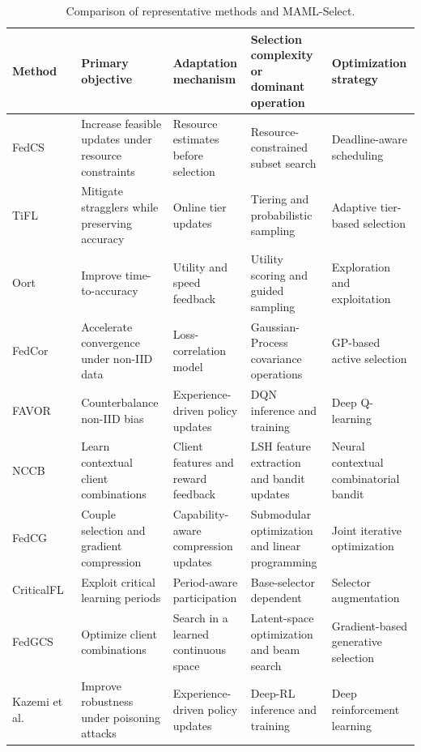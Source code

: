 \documentclass[journal]{IEEEtran}
\begin{document}
\begin{table}[!t]
    \caption{Comparison of representative methods and MAML-Select.}
    \label{tab:related_work_comparison}
    \centering
    \scriptsize
    \setlength{\tabcolsep}{3pt}
    \renewcommand{\arraystretch}{0.98}
    \begin{tabularx}{\textwidth}{lXXXX}
        \toprule
        \textbf{Method} & \textbf{Primary objective} & \textbf{Adaptation mechanism} & \textbf{Selection complexity or dominant operation} & \textbf{Optimization strategy} \\
        \midrule
        FedCS~\cite{nishio2019client} & Increase feasible updates under resource constraints & Resource estimates before selection & Resource-constrained subset search & Deadline-aware scheduling \\
        TiFL~\cite{chai2020tifl} & Mitigate stragglers while preserving accuracy & Online tier updates & Tiering and probabilistic sampling & Adaptive tier-based selection \\
        Oort~\cite{lai2021oort} & Improve time-to-accuracy & Utility and speed feedback & Utility scoring and guided sampling & Exploration and exploitation \\
        FedCor~\cite{tang2022fedcor} & Accelerate convergence under non-IID data & Loss-correlation model & Gaussian-Process covariance operations & GP-based active selection \\
        FAVOR~\cite{wang2020optimizing} & Counterbalance non-IID bias & Experience-driven policy updates & DQN inference and training & Deep Q-learning \\
        NCCB~\cite{pan2024contextual} & Learn contextual client combinations & Client features and reward feedback & LSH feature extraction and bandit updates & Neural contextual combinatorial bandit \\
        FedCG~\cite{xu2024federated} & Couple selection and gradient compression & Capability-aware compression updates & Submodular optimization and linear programming & Joint iterative optimization \\
        CriticalFL~\cite{yan2023criticalfl} & Exploit critical learning periods & Period-aware participation & Base-selector dependent & Selector augmentation \\
        FedGCS~\cite{ning2024fedgcs} & Optimize client combinations & Search in a learned continuous space & Latent-space optimization and beam search & Gradient-based generative selection \\
        Kazemi et al.~\cite{kazemi2026robust} & Improve robustness under poisoning attacks & Experience-driven policy updates & Deep-RL inference and training & Deep reinforcement learning \\

\end{tabularx}
\end{table}
\end{document}
